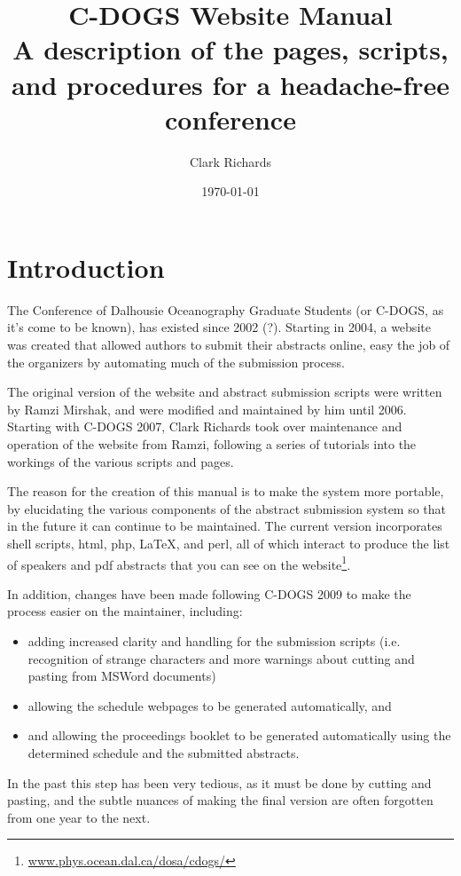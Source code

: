 \documentclass[letterpaper,12pt]{article}
\title{C-DOGS Website Manual \\ A description of the pages, scripts,
  and procedures for a headache-free conference}
\author{Clark Richards}
\date{\today}
\begin{document}
\maketitle

\tableofcontents

\section{Introduction}

The Conference of Dalhousie Oceanography Graduate Students (or C-DOGS,
as it's come to be known), has existed since 2002 (?). Starting in
2004, a website was created that allowed authors to submit their
abstracts online, easy the job of the organizers by automating much of
the submission process.

The original version of the website and abstract submission scripts
were written by Ramzi Mirshak, and were modified and maintained by him
until 2006. Starting with C-DOGS 2007, Clark Richards took over
maintenance and operation of the website from Ramzi, following a
series of tutorials into the workings of the various scripts and
pages.

The reason for the creation of this manual is to make the system more
portable, by elucidating the various components of the abstract
submission system so that in the future it can continue to be
maintained. The current version incorporates shell scripts, html, php,
\LaTeX, and perl, all of which interact to produce the list of
speakers and pdf abstracts that you can see on the
website\footnote{\url{www.phys.ocean.dal.ca/dosa/cdogs/}}.

In addition, changes have been made following C-DOGS 2009 to make the
process easier on the maintainer, including:
\begin{itemize}
\item adding increased clarity and handling for the submission scripts
  (i.e. recognition of strange characters and more warnings about
  cutting and pasting from MSWord documents)
\item allowing the schedule webpages to be generated automatically, and
\item and allowing the proceedings booklet to be generated
  automatically using the determined schedule and the submitted
  abstracts.
\end{itemize}
In the past this step has been very tedious, as it must be done by
cutting and pasting, and the subtle nuances of making the final
version are often forgotten from one year to the next.
\end{document}
